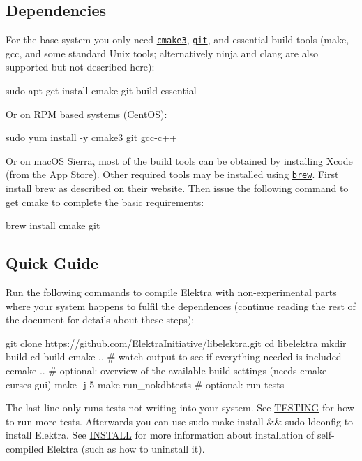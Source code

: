 \subsection*{Dependencies}

For the base system you only need \href{https://cmake.org/cmake/help/v3.0/}{\tt cmake3}, \href{https://git-scm.com/}{\tt git}, and essential build tools (make, gcc, and some standard Unix tools; alternatively ninja and clang are also supported but not described here)\+:


\begin{DoxyCode}
sudo apt-get install cmake git build-essential
\end{DoxyCode}


Or on R\+PM based systems (Cent\+OS)\+:


\begin{DoxyCode}
sudo yum install -y cmake3 git gcc-c++
\end{DoxyCode}


Or on mac\+OS Sierra, most of the build tools can be obtained by installing Xcode (from the App Store). Other required tools may be installed using \href{http://brew.sh/}{\tt brew}. First install brew as described on their website. Then issue the following command to get cmake to complete the basic requirements\+:


\begin{DoxyCode}
brew install cmake git
\end{DoxyCode}


\subsection*{Quick Guide}

Run the following commands to compile Elektra with non-\/experimental parts where your system happens to fulfil the dependences (continue reading the rest of the document for details about these steps)\+:


\begin{DoxyCode}
git clone https://github.com/ElektraInitiative/libelektra.git
cd libelektra
mkdir build
cd build
cmake ..  # watch output to see if everything needed is included
ccmake .. # optional: overview of the available build settings (needs cmake-curses-gui)
make -j 5
make run\_nokdbtests  # optional: run tests
\end{DoxyCode}


The last line only runs tests not writing into your system. See \hyperlink{doc_TESTING_md}{T\+E\+S\+T\+I\+NG} for how to run more tests. Afterwards you can use {\ttfamily sudo make install \&\& sudo ldconfig} to install Elektra. See \hyperlink{doc_INSTALL_md}{I\+N\+S\+T\+A\+LL} for more information about installation of self-\/compiled Elektra (such as how to uninstall it).


